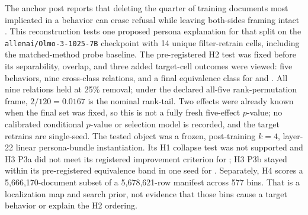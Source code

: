 The anchor post reports that deleting the quarter of training documents most
implicated in a behavior can erase refusal while leaving both-sides framing
intact \citep{lee2026filtering}. This reconstruction tests one proposed
persona explanation for that split on the
\texttt{allenai/Olmo-3-1025-7B} checkpoint with 14 unique filter-retrain cells,
including the matched-method  probe baseline. The
pre-registered H2 test was fixed before its separability, overlap, and three
added target-cell outcomes were viewed: five behaviors, nine cross-class
relations, and a final equivalence class for  and
. All nine relations held at 25\% removal;
under the declared all-five rank-permutation frame, $2/120 = 0.0167$ is the
nominal rank-tail. Two effects were already known when the final set was
fixed, so this is not a fully fresh five-effect $p$-value; no calibrated
conditional $p$-value or selection model is recorded, and the target
retrains are single-seed. The
tested object was a frozen, post-training $k=4$, layer-22 linear
persona-bundle instantiation. Its H1 collapse test was not supported and H3
P3a did not meet its registered improvement criterion for
; H3 P3b stayed within its pre-registered
equivalence band in one seed for . Separately, H4 scores a
5,666,170-document subset of a 5,678,621-row manifest across 577 bins.
That is a localization map and search prior, not evidence that those bins
cause a target behavior or explain the H2 ordering.
